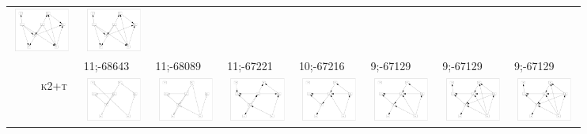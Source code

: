 \begin{table}[!p]
\begin{tabular}{r@{}p{2.0cm}@{}p{2.0cm}@{}p{2.0cm}@{}p{2.0cm}@{}p{2.0cm}@{}p{2.0cm}@{}p{2.0cm}}
\includegraphics[width=20.3mm, height=14.25mm]{fig/11-Mar-2003-18-46-18-dag-asia10000-K2-RES} &
\includegraphics[width=20.3mm, height=14.25mm]{fig/11-Mar-2003-18-46-18-dag-asia15000-K2-RES} \\
& 11;-68643 & 11;-68089 & 11;-67221 & 10;-67216 & 9;-67129 & 9;-67129 & 9;-67129\\
\textsc{k2+t~} &
\includegraphics[width=20.3mm, height=14.25mm]{fig/11-Sep-2003-14-28-11-dag-asia250-K2+MSWT-RES} &
\includegraphics[width=20.3mm, height=14.25mm]{fig/11-Aug-2003-14-51-45-dag-asia500-K2+MSWT-RES} &
\includegraphics[width=20.3mm, height=14.25mm]{fig/11-Mar-2003-18-40-53-dag-asia1000-K2+MSWT-RES} &
\includegraphics[width=20.3mm, height=14.25mm]{fig/11-Mar-2003-18-40-53-dag-asia2000-K2+MSWT-RES} &
\includegraphics[width=20.3mm, height=14.25mm]{fig/11-Mar-2003-18-40-53-dag-asia5000-K2+MSWT-RES} &
\includegraphics[width=20.3mm, height=14.25mm]{fig/11-Mar-2003-18-40-53-dag-asia10000-K2+MSWT-RES} &
\includegraphics[width=20.3mm, height=14.25mm]{fig/11-Mar-2003-18-40-53-dag-asia15000-K2+MSWT-RES} \\

\end{tabular}
\end{table}
